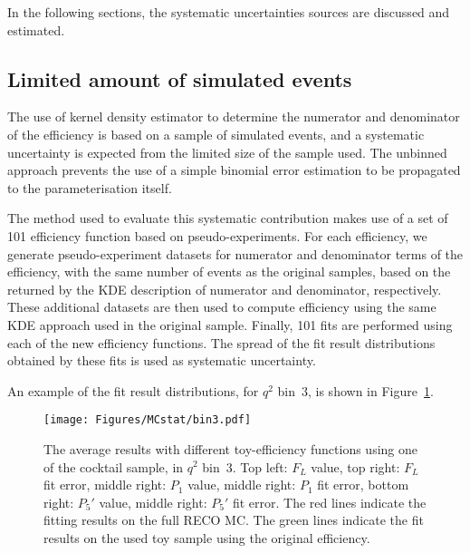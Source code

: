 In the following sections, the systematic uncertainties sources are discussed and estimated.

\subsection{Limited amount of simulated events}
\label{sec:sys-lim.MCstat}

The use of kernel density estimator to determine the numerator and denominator of the efficiency is based on a sample of simulated events, and a systematic uncertainty is expected from the limited size of the sample used.
The unbinned approach prevents the use of a simple binomial error estimation to be propagated to the parameterisation itself.


The method used to evaluate this systematic contribution makes use of a set of 101 efficiency function based on pseudo-experiments.
For each efficiency, we generate pseudo-experiment datasets for numerator and denominator terms of the efficiency, with the same number of events as the original samples, based on the \pdf returned by the KDE description of numerator and denominator, respectively.
These additional datasets are then used to compute efficiency using the same KDE approach used in the original sample.
Finally, 101 fits are performed using each of the new efficiency functions.
The spread of the fit result distributions obtained by these fits is used as systematic uncertainty.

An example of the fit result distributions, for $q^2$ bin~3, is shown in Figure~\ref{fig:BKG-bin3}.

\begin{figure}[!hbt]
  \centering
  \texttt{[image: Figures/MCstat/bin3.pdf]}
  \caption{The average results with different toy-efficiency functions using one of the cocktail sample, in $q^2$ bin~3.
    Top left: $F_L$ value, top right: $F_L$ fit error, middle right: $P_1$ value, middle right: $P_1$ fit error, bottom right: $P_5'$ value, middle right: $P_5'$ fit error.
    The red lines indicate the fitting results on the full RECO MC.
    The green lines indicate the fit results on the used toy sample using the original efficiency.}
  \label{fig:BKG-bin3}
\end{figure}

